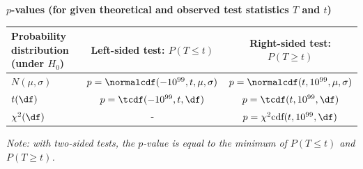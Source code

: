 \documentclass[11pt,a4paper,english]{article} %
\begin{document}
\newpage

\textbf{$p$-values (for given theoretical and observed test statistics $T$ and $t$)}

    \begin{table}[H]
        \centering
        \renewcommand{\arraystretch}{1.5}
        \begin{tabular}{m{4.5cm}|cc}
            \toprule
                \textbf{Probability distribution (under $H_0$)} & \textbf{Left-sided test: $P(T \le t)$} & \textbf{Right-sided test: $P(T \ge t)$} \\
            \midrule
                $N(\mu, \sigma)$ & $p = \normalcdf(-10^{99}, t, \mu, \sigma)$ & $p = \normalcdf(t, 10^{99}, \mu, \sigma)$ \\
            \midrule
                $t(\df)$ & $p = \tcdf(-10^{99}, t, \df)$ & $p = \tcdf(t, 10^{99}, \df)$\\
            \midrule
                $\chi^2(\df)$ & - & $p = \chi^2\text{cdf}(t, 10^{99}, \df)$ \\
            \bottomrule
        \end{tabular}
    \end{table}

    {\itshape Note: with two-sided tests, the $p$-value is equal to the minimum of $P(T \leq t)$ and $P(T \geq t)$.}
\vspace{0.5cm}
\end{document}
